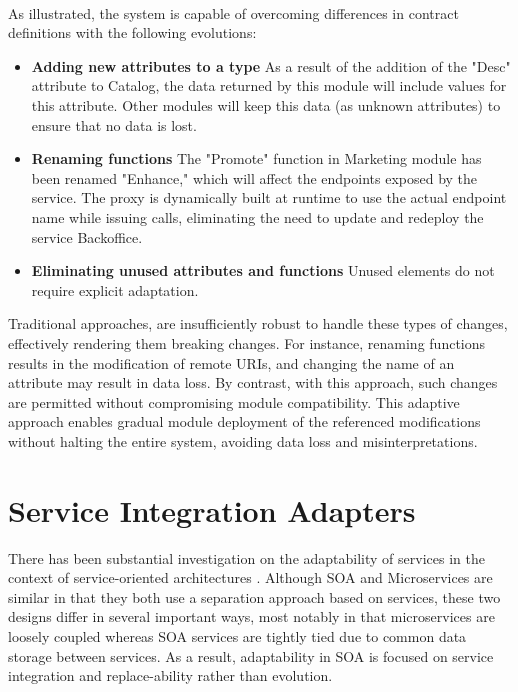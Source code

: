 \paragraph{}

As illustrated,
the system is capable of overcoming differences in contract definitions with the following evolutions:

\begin{itemize}
    \item \textbf{Adding new attributes to a type} As a result of the addition of the "Desc" attribute to Catalog, the data returned by this module will include values for this attribute.
    Other modules will keep this data (as unknown attributes) to ensure that no data is lost.
    \item \textbf{Renaming functions} The "Promote" function in Marketing module has been renamed "Enhance," which will affect the endpoints exposed by the service.
    The proxy is dynamically built at runtime to use the actual endpoint name while issuing calls, eliminating the need to update and redeploy the service Backoffice.
    \item \textbf{Eliminating unused attributes and functions} Unused elements do not require explicit adaptation.
\end{itemize}

Traditional approaches, are insufficiently robust to handle these types of changes, effectively rendering them breaking changes.
For instance, renaming functions results in the modification of remote URIs, and changing the name of an attribute may result in data loss.
By contrast, with this approach, such changes are permitted without compromising module compatibility.
This adaptive approach enables gradual module deployment of the referenced modifications without halting the entire system, avoiding data loss and misinterpretations.

\section{Service Integration Adapters} %
\label{sec:service_integration_adapters}

There has been substantial investigation on the adaptability of services in the context of service-oriented architectures \cite{adaptersWebServices} .
Although SOA and Microservices are similar in that they both use a separation approach based on services,
these two designs differ in several important ways, most notably in that microservices are loosely coupled whereas SOA services are tightly tied due to common data storage between services.
As a result, adaptability in SOA is focused on service integration and replace-ability rather than evolution.

